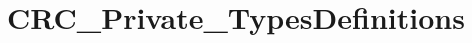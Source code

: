 \hypertarget{group___c_r_c___private___types_definitions}{}\section{C\+R\+C\+\_\+\+Private\+\_\+\+Types\+Definitions}
\label{group___c_r_c___private___types_definitions}
